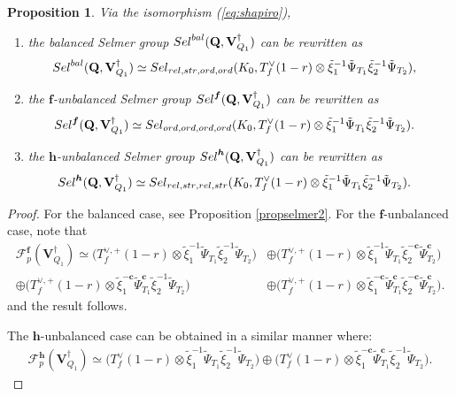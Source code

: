 \documentclass[10pt,letterpaper]{amsart}
\theoremstyle{plain}
\theoremstyle{definition}
\theoremstyle{definition}
\theoremstyle{plain}
\newtheorem{prop}[thm]{Proposition}
\theoremstyle{plain}
\theoremstyle{plain}
\theoremstyle{remark}
\numberwithin{equation}{section}
\newcommand{\cc}{\mathbf{c}}
\newcommand{\ch}{\xi}
\newcommand{\relstr}{{{\rm rel},{\rm str}}}
\newcommand{\ord}{{{\rm ord},{\rm ord}}}
\newcommand{\Vsdag}{{\mathbf{V}_{Q_1}^\dagger}}
\newcommand{\unb}{{\boldsymbol{f}}}
\newcommand{\Q}{\mathbf{Q}}
\newcommand{\bff}{{\boldsymbol{f}}}
\newcommand{\bfh}{{\boldsymbol{h}}}
\begin{document}
\begin{prop}\label{prop:factor-S}
Via the isomorphism (\ref{eq:shapiro}), 
\begin{enumerate}
    \item the balanced Selmer group ${\rm Sel}^{\rm bal}(\Q,\Vsdag)$ can be rewritten as
\begin{align*}
{\rm Sel}^{\rm bal}(\Q,\Vsdag)&\simeq{\rm Sel}_{\relstr,\ord}(K_0,T_f^{\vee}(1-r)\otimes\tilde{\ch}_1^{-1}\tilde{\Psi}_{T_1}\tilde{\ch}_2^{-1}\tilde{\Psi}_{T_2}),
\end{align*}
\item the $\unb$-unbalanced Selmer group ${\rm Sel}^{\unb}(\Q,\Vsdag)$ can be rewritten as
\begin{align*}
{\rm Sel}^{\unb}(\Q,\Vsdag)&\simeq
{\rm Sel}_{\ord,\ord}(K_0,T_f^{\vee}(1-r)\otimes\tilde{\ch}_1^{-1}\tilde{\Psi}_{T_1}\tilde{\ch}_2^{-1}\tilde{\Psi}_{T_2}).\end{align*}
\item the $\bfh$-unbalanced Selmer group ${\rm Sel}^{\bfh}(\Q,\Vsdag)$ can be rewritten as
\begin{align*}
{\rm Sel}^{\bfh}(\Q,\Vsdag)&\simeq
{\rm Sel}_{\relstr,\relstr}(K_0,T_f^{\vee}(1-r)\otimes\tilde{\ch}_1^{-1}\tilde{\Psi}_{T_1}\tilde{\ch}_2^{-1}\tilde{\Psi}_{T_2}).\end{align*}
\end{enumerate}
\end{prop}

\begin{proof} For the balanced case, see Proposition \ref{propselmer2}. For the $\unb$-unbalanced case, note that 
\begin{equation}\label{eq:unbal-def}
\begin{aligned}
\mathscr{F}^{\bff}_p(\Vsdag)
\simeq\bigl(T_f^{\vee,+}(1-r)\otimes\tilde{\ch}_1^{-1}\tilde{\Psi}_{T_1}\tilde{\ch}_2^{-1}\tilde{\Psi}_{T_2}\bigr)&\oplus\bigl(T_f^{\vee,+}(1-r)\otimes\tilde{\ch}_1^{-1}\tilde{\Psi}_{T_1}\tilde{\ch}_2^{-\cc}\tilde{\Psi}_{T_2}^{\cc}\bigr)\\
\oplus\bigl(T_f^{\vee,+}(1-r)\otimes\tilde{\ch}_1^{-\cc}\tilde{\Psi}_{T_1}^{\cc}\tilde{\ch}_2^{-1}\tilde{\Psi}_{T_2}\bigr)&\oplus\bigl(T_f^{\vee,+}(1-r)\otimes\tilde{\ch}_1^{-\cc}\tilde{\Psi}_{T_1}^{\cc}\tilde{\ch}_2^{-\cc}\tilde{\Psi}_{T_2}^{\cc}\bigr).
\end{aligned}
\end{equation}
and the result follows. 

The $\bfh$-unbalanced case can be obtained in a similar manner where:
\begin{equation*}
    \begin{aligned}
\mathscr{F}^{\bfh}_p(\Vsdag)
\simeq\bigl(T_f^{\vee}(1-r)\otimes\tilde{\ch}_1^{-1}\tilde{\Psi}_{T_1}\tilde{\ch}_2^{-1}\tilde{\Psi}_{T_2}\bigr)
\oplus\bigl(T_f^{\vee}(1-r)\otimes\tilde{\ch}_1^{-\cc}\tilde{\Psi}_{T_1}^{\cc}\tilde{\ch}_2^{-1}\tilde{\Psi}_{T_2}\bigr).
\end{aligned}
\end{equation*}
\end{proof}
\end{document}
